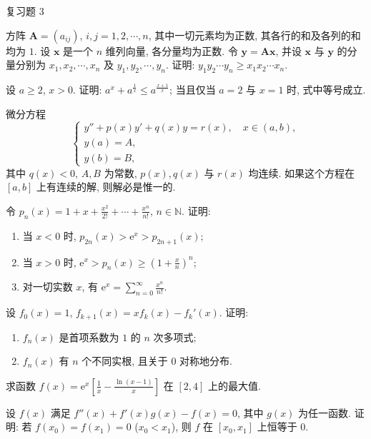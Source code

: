 \begin{exblock}{复习题 3}
    \item 方阵 $\boldsymbol{A}=(a_{ij})$, $i,j=1,2,\cdots,n$, 其中一切元素均为正数, 其各行的和及各列的和均为 $1$. 设 $\boldsymbol{x}$ 是一个 $n$ 维列向量, 各分量均为正数. 令 $\boldsymbol{y}=\boldsymbol{A}\boldsymbol{x}$, 并设 $\boldsymbol{x}$ 与 $\boldsymbol{y}$ 的分量分别为 $x_{1},x_{2},\cdots,x_{n}$ 及 $y_{1},y_{2},\cdots,y_{n}$. 证明: $y_{1}y_{2}\cdots y_{n}\geqslant x_{1}x_{2}\cdots x_{n}$.

    \item 设 $a\geqslant 2$, $x>0$. 证明: $a^{x}+a^{\frac{1}{x}}\leqslant a^{\frac{x+1}{x}}$; 当且仅当 $a=2$ 与 $x=1$ 时, 式中等号成立.

    \item 微分方程
    \[
    \begin{cases}
    y''+p(x)y'+q(x)y=r(x),\quad x\in(a,b),\\
    y(a)=A,\\
    y(b)=B,
\end{cases}
\]
    其中 $q(x)<0$, $A,B$ 为常数, $p(x),q(x)$ 与 $r(x)$ 均连续. 如果这个方程在 $[a,b]$ 上有连续的解, 则解必是惟一的.

    \item 令 $p_{n}(x)=1+x+\frac{x^{2}}{2!}+\cdots+\frac{x^{n}}{n!}$, $n\in\mathbb{N}$. 证明:
    \begin{enumerate}[label=(\arabic*)]
        \item 当 $x<0$ 时, $p_{2n}(x)>\mathrm{e}^{x}>p_{2n+1}(x)$;
        \item 当 $x>0$ 时, $\mathrm{e}^{x}>p_{n}(x)\geqslant\left(1+\frac{x}{n}\right)^{n}$;
        \item 对一切实数 $x$, 有 $\mathrm{e}^{x}=\sum\limits_{n=0}^{\infty}\frac{x^{n}}{n!}$.
    \end{enumerate}

    \item 设 $f_{0}(x)=1$, $f_{k+1}(x)=xf_{k}(x)-f_{k}'(x)$. 证明:
    \begin{enumerate}[label=(\arabic*)]
        \item $f_{n}(x)$ 是首项系数为 $1$ 的 $n$ 次多项式;
        \item $f_{n}(x)$ 有 $n$ 个不同实根, 且关于 $0$ 对称地分布.
    \end{enumerate}

    \item 求函数 $f(x)=\mathrm{e}^{x}\left[\frac{1}{x}-\frac{\ln(x-1)}{x}\right]$ 在 $[2,4]$ 上的最大值.

    \item 设 $f(x)$ 满足 $f''(x)+f'(x)g(x)-f(x)=0$, 其中 $g(x)$ 为任一函数. 证明: 若 $f(x_{0})=f(x_{1})=0$ ($x_{0}<x_{1}$), 则 $f$ 在 $[x_{0},x_{1}]$ 上恒等于 $0$.


\end{exblock}
